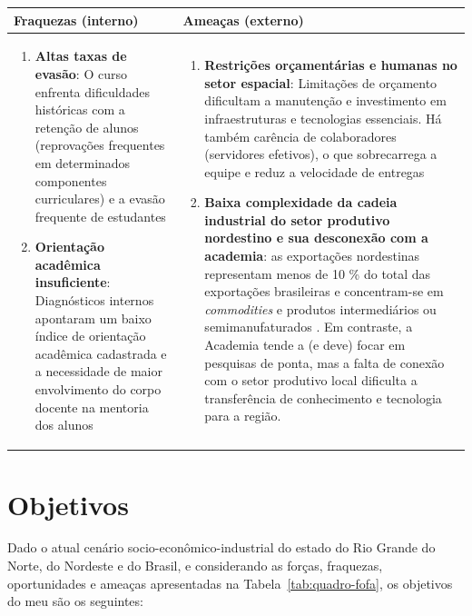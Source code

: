 \documentclass{article}
\begin{document}
\begin{table}[htbp]
\begin{tabular}{|p{}|p{}|}
    \hline
    \textbf{Fraquezas} (interno) & \textbf{Ameaças} (externo) \\
    \hline
    \begin{enumerate}[label=f\arabic*]\vspace{0pt}\item \textbf{Altas taxas de evasão}: O curso enfrenta dificuldades históricas com a retenção de alunos (reprovações frequentes em determinados componentes curriculares) e a evasão frequente de estudantes \cite{ufrn_resolucao_sipac} \item \textbf{Orientação acadêmica insuficiente}: Diagnósticos internos apontaram um baixo índice de orientação acadêmica cadastrada e a necessidade de maior envolvimento do corpo docente na mentoria dos alunos \cite{ufrn_resolucao_sipac} \end{enumerate}
    &
    \begin{enumerate}[label=A\arabic*]\vspace{0pt}\item \textbf{Restrições orçamentárias e humanas no setor espacial}: Limitações de orçamento dificultam a manutenção e investimento em infraestruturas e tecnologias essenciais. Há também carência de colaboradores (servidores efetivos), o que sobrecarrega a equipe e reduz a velocidade de entregas \cite{aeb_relatorio_gestao_2025} \item \textbf{Baixa complexidade da cadeia industrial do setor produtivo nordestino e sua desconexão com a academia}:  as exportações nordestinas representam menos de 10 \% do total das exportações brasileiras e concentram-se em \textit{commodities} e produtos intermediários ou semimanufaturados \cite{ipea_240_1}. Em contraste, a Academia tende a (e deve) focar em pesquisas de ponta, mas a falta de conexão com o setor produtivo local dificulta a transferência de conhecimento e tecnologia para a região. \end{enumerate} \\
    \hline
  \end{tabular}
\end{table}

\section{Objetivos}
\label{sec:objetivos}

Dado o atual cenário socio-econômico-industrial do estado do Rio Grande do Norte, do Nordeste e do Brasil, e considerando as forças, fraquezas, oportunidades e ameaças apresentadas na Tabela~\ref{tab:quadro-fofa}, os objetivos do meu  são os seguintes:
\end{document}
